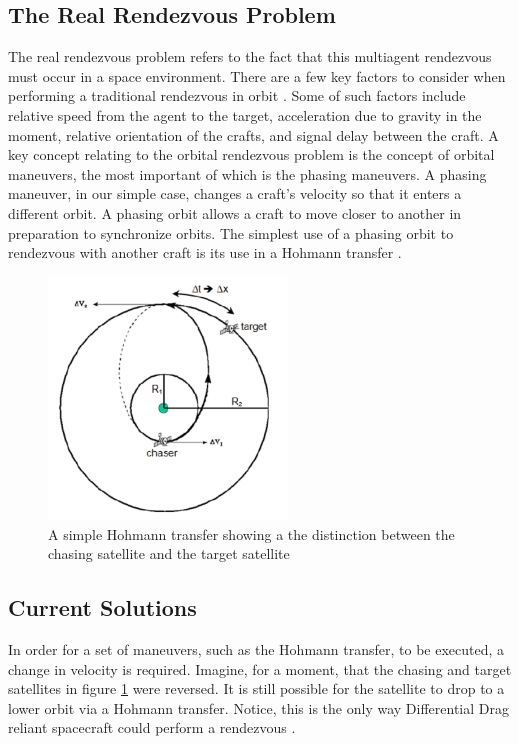 \documentclass[journal,a4paper,12pt]{IEEEtran}
\begin{document}
\subsection{The Real Rendezvous Problem}
The real rendezvous problem refers to the fact that this multiagent rendezvous must
occur in a space environment. There are a few key factors to consider when performing
a traditional rendezvous in orbit \cite{auto_rend}. Some of such factors include relative speed
from the agent to the target, acceleration due to gravity in the moment, relative orientation
of the crafts, and signal delay between the craft.
A key concept relating to the orbital rendezvous problem is the concept of orbital
maneuvers, the most important of which is the phasing maneuvers. A phasing maneuver, in our
simple case, changes a craft's velocity so that it enters a different orbit. A phasing
orbit allows a craft to move closer to another in preparation to synchronize orbits.
The simplest use of a phasing orbit to rendezvous with another craft is its use
in a Hohmann transfer \cite{okwow}.

\begin{figure}[h!]
  \centering
  \includegraphics[width=2.5in]{img/HohmannTransfer}
  \caption{A simple Hohmann transfer showing a the distinction between the chasing
  satellite and the target satellite}
  \label{hohmann}
\end{figure}

\subsection{Current Solutions}
In order for a set of maneuvers, such as the Hohmann transfer, to be executed, a
change in velocity is required. Imagine, for a moment, that the chasing and target
satellites in figure \ref{hohmann} were reversed. It is still possible for the satellite
to drop to a lower orbit via a Hohmann transfer. Notice, this is the only way Differential
Drag reliant spacecraft could perform a rendezvous \cite{horsley}.
\end{document}
